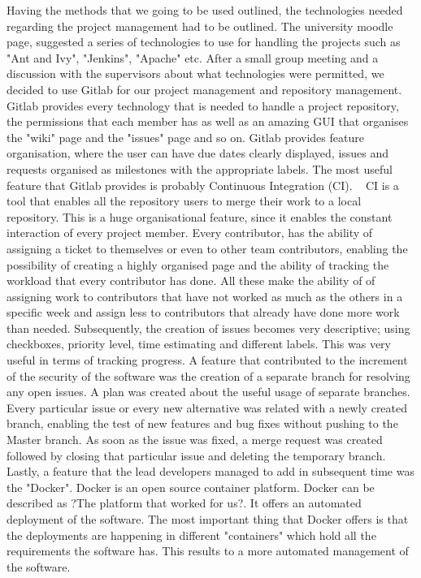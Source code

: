 \documentclass{l3proj}
\begin{document}
Having the methods that we going to be used outlined, the technologies needed regarding the project management had to be outlined. The university moodle page, suggested a series of technologies to use for handling the projects such as "Ant and Ivy", "Jenkins", "Apache" etc. After a small group meeting and a discussion with the supervisors about what technologies were permitted, we decided to use Gitlab for our project management and repository management. Gitlab provides every technology that is needed to handle a project repository, the permissions that each member has as well as an amazing GUI that organises the "wiki" page and the "issues" page and so on. Gitlab provides feature organisation, where the user can have due dates clearly displayed, issues and requests organised as milestones with the appropriate labels. The most useful feature that Gitlab provides is probably Continuous Integration (CI). ~\cite{ci} CI is a tool that enables all the repository users to merge their work to a local repository. This is a huge organisational feature, since it enables the constant interaction of every project member. Every contributor, has the ability of assigning a ticket to themselves or even to other team contributors, enabling the possibility of creating a highly organised page and the ability of tracking the workload that every contributor has done. All these make the ability of of assigning work to contributors that have not worked as much as the others in a specific week and assign less to contributors that already have done more work than needed. Subsequently, the creation of issues becomes very descriptive; using checkboxes, priority level, time estimating and different labels. This was very useful in terms of tracking progress. A feature that contributed to the increment of the security of the software was the creation of a separate branch for resolving any open issues. A plan was created about the useful usage of separate branches. Every particular issue or every new alternative was related with a newly created branch, enabling the test of new features and bug fixes without pushing to the Master branch. As soon as the issue was fixed, a merge request was created followed by closing that particular issue and deleting the temporary branch. Lastly, a feature that the lead developers managed to add in subsequent time was the "Docker". Docker is an open source container platform. Docker can be described as ?The platform that worked for us?. It offers an automated deployment of the software. The most important thing that Docker offers is that the deployments are happening in different "containers" which hold all the requirements the software has. This results to a more automated management of the software.
\end{document}

